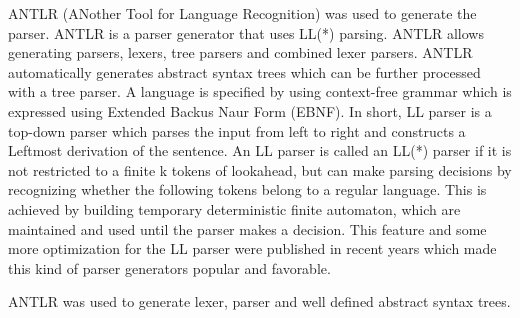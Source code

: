 ANTLR (ANother Tool for Language Recognition) was used to generate the parser. ANTLR is a 
parser generator that uses LL(*) parsing. ANTLR allows generating parsers, lexers, tree 
parsers and combined lexer parsers. ANTLR automatically generates abstract syntax trees
which can be further processed with a tree parser. A language is specified by using context-free
grammar which is expressed using Extended Backus Naur Form (EBNF). In short, LL parser is a 
top-down parser which parses the input from left to right and constructs a Leftmost derivation 
of the sentence. An LL parser is called an LL(*) parser if it is not restricted to a finite k 
tokens of lookahead, but can make parsing decisions by recognizing whether the following tokens
belong to a regular language. This is achieved by building temporary deterministic finite
automaton, which are maintained and used until the parser makes a decision. This feature and
some more optimization for the LL parser were published in recent years which made this kind 
of parser generators popular and favorable.

ANTLR was used to generate lexer, parser and well defined abstract syntax trees. 